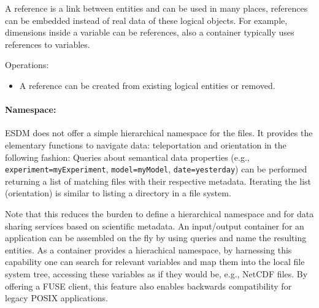 A reference is a link between entities and can be used in many places, references can be embedded instead of real data of these logical objects.
For example, dimensions inside a variable can be references, also a container typically uses references to variables.
 
Operations:

\begin{itemize}
  \item A reference can be created from existing logical entities or removed.
\end{itemize}


\paragraph{Namespace:}%
\label{namespace}

ESDM does not offer a simple hierarchical namespace for the files.
It provides the elementary functions to navigate data: teleportation and orientation in the following fashion: Queries about semantical data properties (e.g., \texttt{experiment=myExperiment}, \texttt{model=myModel}, \texttt{date=yesterday}) can be performed returning a list of matching files with their respective metadata.
Iterating the list (orientation) is similar to listing a directory in a file system.
 
Note that this reduces the burden to define a hierarchical namespace and for data sharing services based on scientific metadata.
An input/output container for an application can be assembled on the fly by using queries and name the resulting entities.
As a container provides a hierachical namespace, by harnessing this capability one can search for relevant variables and map them into the local file system tree, accessing these variables as if they would be, e.g., NetCDF files.
By offering a FUSE client, this feature also enables backwards compatibility for legacy POSIX applications.
 
